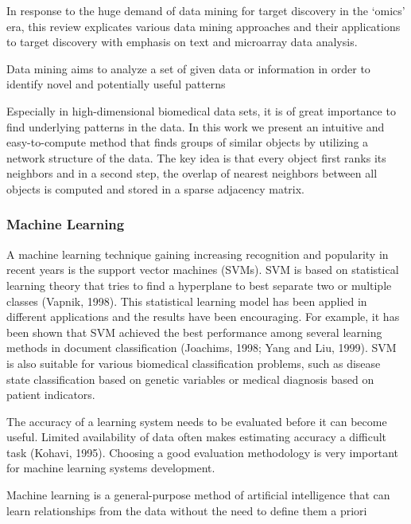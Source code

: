 \documentclass[10pt,a4paper]{article}
\begin{document}
	
	In response to the huge demand of data mining for target discovery in the ‘omics’ era, this review explicates various data mining approaches and their applications to target discovery with emphasis on text and microarray data analysis. \cite{YANG2012S16}

	
	 Data mining
	aims to analyze a set of given data or information in order to identify novel
	and potentially useful patterns \cite{chen2006medical}
	
	Especially in high-dimensional biomedical data sets, it is of great importance to find underlying patterns in the data. In this work we present an intuitive and easy-to-compute method that finds groups of similar objects by utilizing a network structure of the data. The key idea is that every object first ranks its neighbors and in a second step, the overlap of nearest neighbors between all objects is computed and stored in a sparse adjacency matrix. \cite{7024124}
	
	\subsubsection{Machine Learning}
	
	A machine learning technique gaining increasing recognition and
	popularity in recent years is the support vector machines (SVMs). SVM is
	based on statistical learning theory that tries to find a hyperplane to best
	separate two or multiple classes (Vapnik, 1998). This statistical learning
	model has been applied in different applications and the results have been
	encouraging. For example, it has been shown that SVM achieved the best
	performance among several learning methods in document classification
	(Joachims, 1998; Yang and Liu, 1999). SVM is also suitable for various
	biomedical classification problems, such as disease state classification based
	on genetic variables or medical diagnosis based on patient indicators. \cite{chen2006medical}
	
	The accuracy of a learning system needs to be evaluated before it can
	become useful. Limited availability of data often makes estimating accuracy
	a difficult task (Kohavi, 1995). Choosing a good evaluation methodology is
	very important for machine learning systems development. \cite{chen2006medical}
	
	Machine learning is a general-purpose method of artificial intelligence that can learn relationships from the data without the need to define them a priori \cite{doi:10.1093/bib/bbx044}
	
\end{document}
